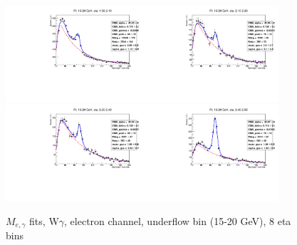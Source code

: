 \begin{figure}[htb]
\begin{center}
   \includegraphics[width=0.45\textwidth]{../figs/figs_v11/ELECTRON_WGamma/EtoGammaFits/sa_hZmass_h_Data_EtoGamma_Enr_ENDCAP_pt15to20_ieta0_noWMtCut.pdf}\includegraphics[width=0.45\textwidth]{../figs/figs_v11/ELECTRON_WGamma/EtoGammaFits/sa_hZmass_h_Data_EtoGamma_Enr_ENDCAP_pt15to20_ieta1_noWMtCut.pdf}\\
   \includegraphics[width=0.45\textwidth]{../figs/figs_v11/ELECTRON_WGamma/EtoGammaFits/sa_hZmass_h_Data_EtoGamma_Enr_ENDCAP_pt15to20_ieta2_noWMtCut.pdf}\includegraphics[width=0.45\textwidth]{../figs/figs_v11/ELECTRON_WGamma/EtoGammaFits/sa_hZmass_h_Data_EtoGamma_Enr_ENDCAP_pt15to20_ieta3_noWMtCut.pdf}\\
  \label{fig:etogFits_15to20}
  \caption{$M_{e,\gamma}$ fits, W$\gamma$, electron channel, underflow bin (15-20 GeV), 8 eta bins}
  \end{center}
\end{figure}

